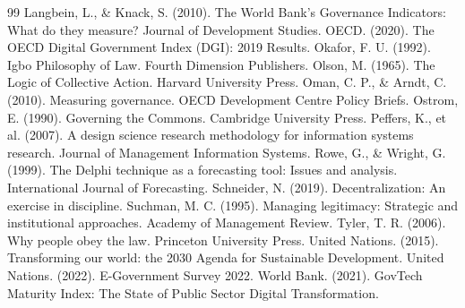 \documentclass[sigconf,anonymous]{acmart}
\begin{document}
\begin{thebibliography}{99}
 Langbein, L., \& Knack, S. (2010). The World Bank’s Governance Indicators: What do they measure? Journal of Development Studies.
 OECD. (2020). The OECD Digital Government Index (DGI): 2019 Results.
 Okafor, F. U. (1992). Igbo Philosophy of Law. Fourth Dimension Publishers.
 Olson, M. (1965). The Logic of Collective Action. Harvard University Press.
 Oman, C. P., \& Arndt, C. (2010). Measuring governance. OECD Development Centre Policy Briefs.
 Ostrom, E. (1990). Governing the Commons. Cambridge University Press.
 Peffers, K., et al. (2007). A design science research methodology for information systems research. Journal of Management Information Systems.
 Rowe, G., \& Wright, G. (1999). The Delphi technique as a forecasting tool: Issues and analysis. International Journal of Forecasting.
 Schneider, N. (2019). Decentralization: An exercise in discipline.
 Suchman, M. C. (1995). Managing legitimacy: Strategic and institutional approaches. Academy of Management Review.
 Tyler, T. R. (2006). Why people obey the law. Princeton University Press.
 United Nations. (2015). Transforming our world: the 2030 Agenda for Sustainable Development.
 United Nations. (2022). E-Government Survey 2022.
 World Bank. (2021). GovTech Maturity Index: The State of Public Sector Digital Transformation.

\end{thebibliography}
\end{document}
